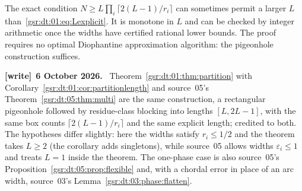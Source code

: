 \documentclass[11pt,letterpaper]{article}
\numberwithin{equation}{section}
\theoremstyle{definition}
\theoremstyle{remark}
\newcommand{\1}{\mathbf 1}
\newenvironment{writenote}[1][]{\par\smallskip\begingroup\small
 \noindent\textbf{[write]}\if\relax\detokenize{#1}\relax\else~\textbf{#1.}\fi\ }%
 {\par\endgroup\smallskip}
\begin{document}
The exact condition $N\ge L\prod_i\lceil2(L-1)/r_i\rceil$ can sometimes
permit a larger $L$ than~\eqref{gsr:dt:01:eq:Lexplicit}. It is monotone in $L$ and
can be checked by integer arithmetic once the widths have certified
rational lower bounds. The proof requires no optimal Diophantine
approximation algorithm: the pigeonhole construction suffices.
\begin{writenote}[6 October 2026]
Theorem~\ref{gsr:dt:01:thm:partition} with Corollary~\ref{gsr:dt:01:cor:partitionlength} and source~05's Theorem~\ref{gsr:dt:05:thm:multi} are the same construction, a rectangular pigeonhole followed by residue-class blocking into lengths $[L,2L-1]$, with the same box counts $\lceil2(L-1)/r_i\rceil$ and the same explicit length; credited to both. The hypotheses differ slightly: here the widths satisfy $r_i\le1/2$ and the theorem takes $L\ge2$ (the corollary adds singletons), while source~05 allows widths $\varepsilon_i\le1$ and treats $L=1$ inside the theorem. The one-phase case is also source~05's Proposition~\ref{gsr:dt:05:prop:flexible} and, with a chordal error in place of an arc width, source~03's Lemma~\ref{gsr:dt:03:phase:flatten}.
\end{writenote}

\end{document}
